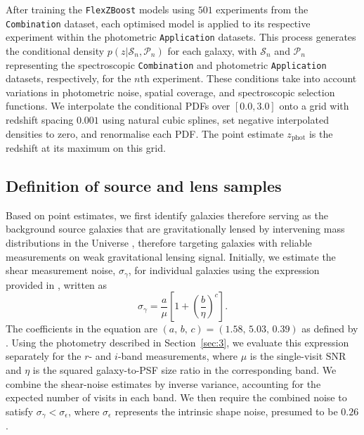 After training the \texttt{FlexZBoost} models using \(501\) experiments from the \texttt{Combination} dataset, each optimised model is applied to its respective experiment within the photometric \texttt{Application} datasets. This process generates the conditional density \(p \left( z | \mathcal{S}_n, \mathcal{P}_n \right)\) for each galaxy, with \(\mathcal{S}_n\) and \(\mathcal{P}_n\) representing the spectroscopic \texttt{Combination} and photometric \texttt{Application} datasets, respectively, for the \(n\mathrm{th}\) experiment. These conditions take into account variations in photometric noise, spatial coverage, and spectroscopic selection functions. We interpolate the conditional PDFs over \([0.0, 3.0]\) onto a grid with redshift spacing \(0.001\) using natural cubic splines, set negative interpolated densities to zero, and renormalise each PDF. The point estimate \(z_{\mathrm{phot}}\) is the redshift at its maximum on this grid.

\subsection{Definition of source and lens samples}
Based on point estimates, we first identify galaxies therefore serving as the background source galaxies that are gravitationally lensed by intervening mass distributions in the Universe \citep{2021A&A...645A.104A, 2022PhRvD.105b3514A, 2022PhRvD.105b3515S, 2023A&A...679A.133L, 2023PhRvD.108l3519D, 2023PhRvD.108l3518L, 2023OJAp....6E..36D, 2025arXiv250319442S, 2025arXiv250319441W}, therefore targeting galaxies with reliable measurements on weak gravitational lensing signal. Initially, we estimate the shear measurement noise, \(\sigma_\gamma\), for individual galaxies using the expression provided in \citep{2002AJ....123..583B}, written as
\begin{equation} \label{eqa:3}
    \sigma_\gamma = \frac{a}{\mu} \left[ 1 + \left( \frac{b}{\eta} \right)^c \right].
\end{equation} The coefficients in the equation are \(\left(a,\, b,\, c\right) = \left(1.58,\, 5.03,\, 0.39\right)\) as defined by \cite{2013MNRAS.434.2121C}. Using the photometry described in Section~\ref{sec:3}, we evaluate this expression separately for the \(r\)- and \(i\)-band measurements, where \(\mu\) is the single-visit \(\mathrm{SNR}\) and \(\eta\) is the squared galaxy-to-PSF size ratio in the corresponding band. We combine the shear-noise estimates by inverse variance, accounting for the expected number of visits in each band. We then require the combined noise to satisfy \(\sigma_\gamma < \sigma_\epsilon\), where \(\sigma_\epsilon\) represents the intrinsic shape noise, presumed to be \(0.26\).

